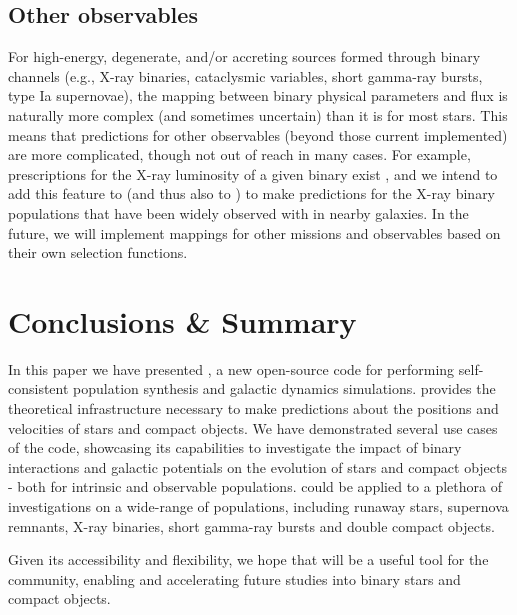 \documentclass[twocolumn, twocolappendix, oneside]{aastex631}
\begin{document}
\subsection{Other observables}\label{sec:other-observables}
For high-energy, degenerate, and/or accreting sources formed through binary channels (e.g., X-ray binaries, cataclysmic variables, short gamma-ray bursts, type Ia supernovae), the mapping between binary physical parameters and flux is naturally more complex (and sometimes uncertain) than it is for most stars. This means that predictions for other observables (beyond those current implemented) are more complicated, though not out of reach in many cases. For example, prescriptions for the X-ray luminosity of a given binary exist \citep{Misra+2023}, and we intend to add this feature to \cosmic{} (and thus also to \cogsworth) to make predictions for the X-ray binary populations that have been widely observed with \chandra{} in nearby galaxies. In the future, we will implement mappings for other missions and observables based on their own selection functions.


\section{Conclusions \& Summary}\label{sec:conclusions}

In this paper we have presented \cogsworth, a new open-source code for performing self-consistent population synthesis and galactic dynamics simulations. \cogsworth provides the theoretical infrastructure necessary to make predictions about the positions and velocities of stars and compact objects. We have demonstrated several use cases of the code, showcasing its capabilities to investigate the impact of binary interactions and galactic potentials on the evolution of stars and compact objects - both for intrinsic and observable populations. \cogsworth could be applied to a plethora of investigations on a wide-range of populations, including runaway stars, supernova remnants, X-ray binaries, short gamma-ray bursts and double compact objects.

Given its accessibility and flexibility, we hope that \cogsworth will be a useful tool for the community, enabling and accelerating future studies into binary stars and compact objects.
\end{document}
